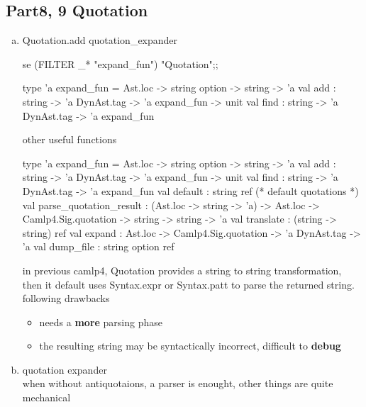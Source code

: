 \subsection{Part8, 9 Quotation}
  \begin{enumerate}[(a)]
  \item Quotation.add  quotation\_expander 

\begin{redcode}
se (FILTER _* "expand_fun") "Quotation";;
\end{redcode}

\begin{bluecode}
type 'a expand_fun = Ast.loc -> string option -> string -> 'a
val add : string -> 'a DynAst.tag -> 'a expand_fun -> unit
val find : string -> 'a DynAst.tag -> 'a expand_fun      
\end{bluecode}

other useful functions 
  \begin{bluecode}
type 'a expand_fun = Ast.loc -> string option -> string -> 'a
val add : string -> 'a DynAst.tag -> 'a expand_fun -> unit
val find : string -> 'a DynAst.tag -> 'a expand_fun
val default : string ref  (* default quotations *)
val parse_quotation_result :
      (Ast.loc -> string -> 'a) ->
      Ast.loc -> Camlp4.Sig.quotation -> string -> string -> 'a
val translate : (string -> string) ref
val expand : Ast.loc -> Camlp4.Sig.quotation -> 'a DynAst.tag -> 'a
val dump_file : string option ref
\end{bluecode}

in previous camlp4, Quotation provides a string to string
transformation, then it default uses Syntax.expr or Syntax.patt to
parse the returned string. following drawbacks
\begin{itemize}
\item needs a \textbf{more} parsing phase
\item the resulting string may be syntactically incorrect, difficult
  to \textbf{debug}
\end{itemize}

\item quotation expander \\ 
  when without antiquotaions, a parser is enought, other things are
  quite mechanical


\end{enumerate}
